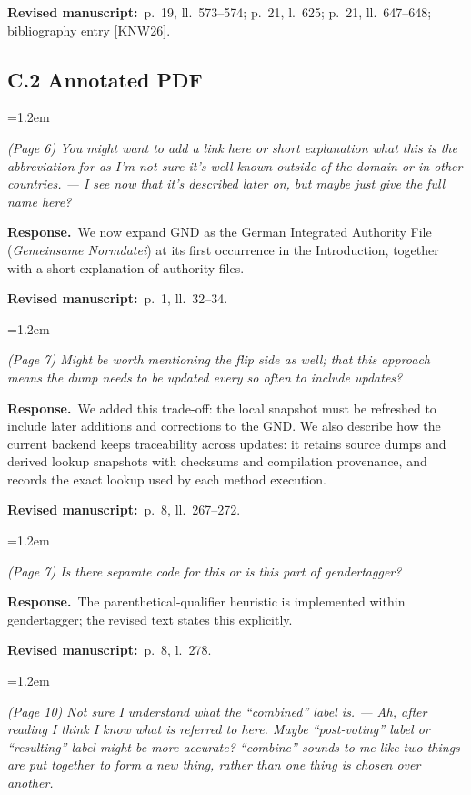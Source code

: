 \documentclass[11pt,a4paper]{article}
\newenvironment{reviewercomment}
  {\par\smallskip\begin{list}{}{\leftmargin=1.2em\rightmargin=0pt}\item[]\color{black!75}\itshape}
  {\end{list}\smallskip}
\newcommand{\response}{\par\noindent\textbf{Response.}~}
\newcommand{\where}[1]{\par\noindent\textbf{Revised manuscript:}~#1\par\medskip}
\begin{document}
\where{p.~19, ll.~573--574; p.~21, l.~625; p.~21, ll.~647--648; bibliography entry [KNW26].}

\subsection*{C.2 Annotated PDF}

\begin{reviewercomment}
(Page 6) You might want to add a link here or short explanation what this is the abbreviation for as
I'm not sure it's well-known outside of the domain or in other countries. --- I see now that it's
described later on, but maybe just give the full name here?
\end{reviewercomment}

\response We now expand GND as the German Integrated Authority File (\emph{Gemeinsame Normdatei}) at
its first occurrence in the Introduction, together with a short explanation of authority files.

\where{p.~1, ll.~32--34.}

\begin{reviewercomment}
(Page 7) Might be worth mentioning the flip side as well; that this approach means the dump needs to
be updated every so often to include updates?
\end{reviewercomment}

\response We added this trade-off: the local snapshot must be refreshed to include later additions
and corrections to the GND. We also describe how the current backend keeps traceability across
updates: it retains source dumps and derived lookup snapshots with checksums and compilation
provenance, and records the exact lookup used by each method execution.

\where{p.~8, ll.~267--272.}

\begin{reviewercomment}
(Page 7) Is there separate code for this or is this part of gendertagger?
\end{reviewercomment}

\response The parenthetical-qualifier heuristic is implemented within gendertagger; the revised text
states this explicitly.

\where{p.~8, l.~278.}

\begin{reviewercomment}
(Page 10) Not sure I understand what the ``combined'' label is. --- Ah, after reading I think I know
what is referred to here. Maybe ``post-voting'' label or ``resulting'' label might be more accurate? ``combine'' sounds to me
like two things are put together to form a new thing, rather than one thing is chosen over another.
\end{reviewercomment}
\end{document}

